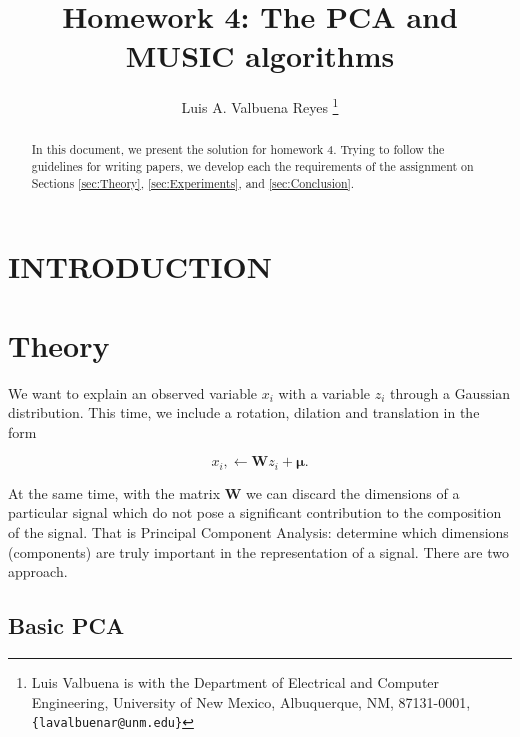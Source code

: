 \documentclass[letterpaper, 10 pt, conference]{ieeeconf}  %
\title{\LARGE \bf
Homework 4: The PCA and MUSIC algorithms
}
\author{Luis A. Valbuena Reyes%
\thanks{Luis Valbuena is with the Department of Electrical and Computer Engineering,
        University of New Mexico, Albuquerque, NM, 87131-0001, {\tt\small \{lavalbuenar@unm.edu\}}}%
}
\begin{document}
\newtheorem{theoremMyThesis}{Theorem}
\newtheorem{corollary}{Corollary}
\newtheorem{problemStatement}{Problem Statement}

\maketitle
\thispagestyle{empty}
\pagestyle{empty}


\begin{abstract}

In this document, we present the solution for homework 4. Trying to follow the guidelines for writing papers, we develop each the requirements of the assignment on Sections \ref{sec:Theory}, \ref{sec:Experiments}, and \ref{sec:Conclusion}.
\end{abstract}



\section{INTRODUCTION}
\label{sec:Intro}





\section{Theory}
\label{sec:Theory}

We want to explain an observed variable $x_{i}$ with a variable $z_{i}$ through a Gaussian distribution. This time, we include 
a rotation, dilation and translation in the form

\begin{equation*}
   x_{i} , \leftarrow \bm{W}z_{i} + \bm{\mu}.
\end{equation*}

At the same time, with the matrix $\bm{W}$ we can discard the dimensions of a particular signal which do not pose a significant contribution to the composition
of the signal. That is Principal Component Analysis: determine which dimensions (components) are truly important in the representation of a signal. There are
two approach.

\subsection{Basic PCA}
\label{sec:TheoryBasicPCA}
\end{document}
